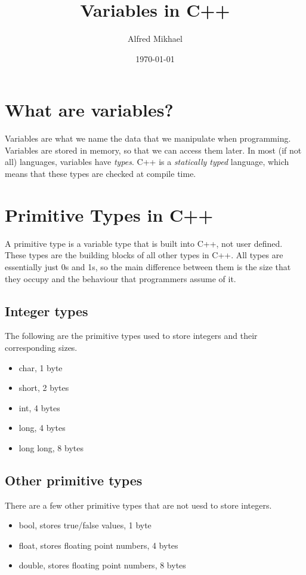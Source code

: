 \documentclass[12pt]{article}
\title{Variables in C++}
\author{Alfred Mikhael}
\date{\today}
\begin{document}
\maketitle

\section{What are variables?}
Variables are what we name the data that we manipulate when programming. Variables are stored in 
memory, so that we can access them later. In most (if not all) languages, variables have \emph{types}.
C++ is a \emph{statically typed} language, which means that these types are checked at compile time.

\section{Primitive Types in C++}
A primitive type is a variable type that is built into C++, not user defined. These types are the 
building blocks of all other types in C++. All types are essentially just 0s and 1s, so the main 
difference between them is the size that they occupy and the behaviour that programmers assume of it.

\subsection{Integer types}
The following are the primitive types used to store integers and their corresponding sizes.
\begin{itemize}
    \item {char, 1 byte}
    \item {short, 2 bytes}
    \item {int, 4 bytes}
    \item {long, 4 bytes}
    \item {long long, 8 bytes}
\end{itemize}

\subsection{Other primitive types}
There are a few other primitive types that are not uesd to store integers.
\begin{itemize}
    \item {bool, stores true/false values, 1 byte}
    \item {float, stores floating point numbers, 4 bytes}
    \item {double, stores floating point numbers, 8 bytes}
\end{itemize}
\end{document}
